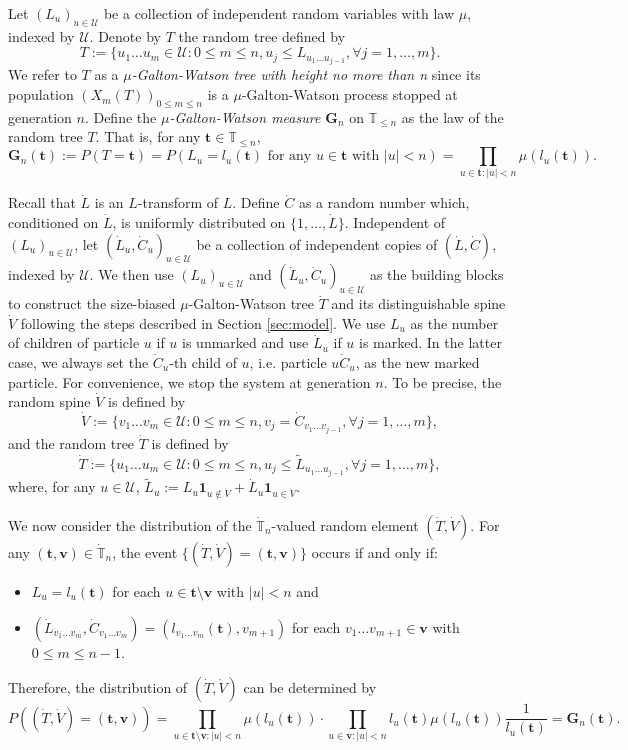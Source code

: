 \documentclass[UTF8]{pkuthss}
\theoremstyle{plain}
\theoremstyle{definition}
\numberwithin{equation}{section}
\begin{document}
Let $(L_u)_{u\in\mathcal U}$ be a collection of independent random variables with law $\mu$, indexed by $\mathcal U$.
Denote by $T$ the random tree defined by
\[
T
:=\{u_1\dots u_m\in \mathcal U: 0\le m\le n, u_j\leq L_{u_1\dots u_{j-1}},\forall j=1,\dots,m\}.
\]
We refer to $T$ as a \emph{$\mu$-Galton-Watson tree with height no more than n} since its population $(X_m(T))_{0\le m\le n}$ is a $\mu$-Galton-Watson process stopped at generation $n$.
Define the \emph{$\mu$-Galton-Watson measure $\mathbf G_n$} on $\mathbb T_{\leq n}$ as the law of the random tree $T$.
That is, for any $ \mathbf t \in\mathbb T_{\leq n}$,
\[
\mathbf G_n( \mathbf t )
:=P(T= \mathbf t )
=P(L_u=l_u( \mathbf t )\text{ for any } u\in \mathbf t  \text{ with }|u|<n)
=\prod_{u\in  \mathbf t :|u|<n}\mu(l_u( \mathbf t )).
\]

Recall that $\dot L$ is an $L$-transform of $L$.
Define $\dot C$ as a random number which, conditioned on $\dot L$, is uniformly distributed on $\{1,\dots,\dot L\}$.
Independent of $(L_u)_{u\in\mathcal U}$, let $(\dot L_u,\dot C_u)_{u\in \mathcal U}$ be a collection of independent copies of $(\dot L,\dot C)$, indexed by $\mathcal U$.
We then use $(L_u)_{u\in\mathcal U}$ and $(\dot L_u,\dot C_u)_{u\in\mathcal U}$ as the building blocks to construct the size-biased $\mu$-Galton-Watson tree $\dot T$ and its distinguishable spine $\dot V$ following the steps described in Section \ref{sec:model}.
We use $L_u$ as the number of children of particle $u$ if $u$ is unmarked and use $\dot L_u$ if $u$ is marked.
In the latter case, we always set the
$\dot C_u$-th child of $u$, i.e. particle $u \dot C_u$,
as the new marked particle.
For convenience, we stop the system at generation $n$. To be precise, the random spine $\dot V$ is defined by
\[
\dot V
:=\{v_1\dots v_m\in \mathcal U:0\le m\le n, v_j=\dot C_{v_1\dots v_{j-1}},\forall j=1,\dots,m\},
\]
and the random tree $\dot T$ is defined by
\[
\dot T
:=\{u_1\dots u_m\in\mathcal U: 0\le m\le n,u_j\leq \tilde L_{u_1\dots u_{j-1}},\forall j=1,\dots,m\},
\]
where, for any $u\in\mathcal U$, $\tilde L_u:=L_u\mathbf 1_{u\not\in \dot V}+\dot L_u\mathbf 1_{u\in \dot V}$.

We now consider the distribution of the $\dot{\mathbb T}_n$-valued random element $(\dot T,\dot V)$.
For any $( \mathbf t , \mathbf v)\in\dot{\mathbb T}_n$, the event $\{(\dot T,\dot V)=( \mathbf t , \mathbf v)\}$ occurs if and only if:
\begin{itemize}
	\item
	$L_u=l_u( \mathbf t )$ for each $u\in  \mathbf t \setminus \mathbf v$ with $| u |<n$ and
	\item
	$(\dot L_{v_1\dots v_m},\dot C_{v_1\dots v_m})=(l_{v_1\dots v_m}( \mathbf t ),v_{m+1})$ for each $v_1\dots v_{m+1}\in \mathbf v$ with $0\le m\le n-1$.
\end{itemize}
Therefore, the distribution of $(\dot T,\dot V)$ can be determined by
\begin{equation}
\label{eq:treespinemeasure}
P((\dot T,\dot V)=( \mathbf t , \mathbf v))
=\prod_{u\in  \mathbf t \setminus \mathbf v:|u|<n}\mu(l_u( \mathbf t ))
\cdot \prod_{u\in  \mathbf v:| u| <n}l_u( \mathbf t )\mu(l_u( \mathbf t ))\frac{1}{l_u( \mathbf t )}
= \mathbf G_n( \mathbf t ).
\end{equation}
\end{document}
